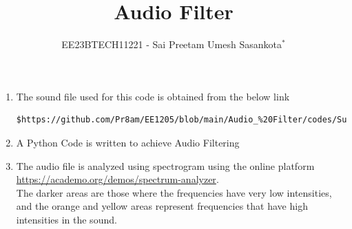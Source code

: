 \documentclass[journal,12pt,twocolumn]{IEEEtran}
\theoremstyle{remark}
\begin{document}

\vspace{3cm}
\title{Audio Filter}
\author{EE23BTECH11221 - Sai Preetam Umesh Sasankota$^{*}$%
}
\maketitle
\newpage
\bigskip
\renewcommand{\thefigure}{\arabic{figure}}
\renewcommand{\thetable}{\theenumi}


\begin{enumerate}[label=\thesection.\arabic*
,ref=\thesection.\theenumi]
\section{Digital Filter}
\label{input_sound}
\item The sound file used for this code is obtained from the below link
\begin{lstlisting}
$https://github.com/Pr8am/EE1205/blob/main/Audio_%20Filter/codes/Sunshine.wav
\end{lstlisting}
\item 
\label{Python code}
A Python Code is written to achieve Audio Filtering 
\label{prob:audio_filter_problem}

\item 
\label{Visualization}

The audio file is analyzed using spectrogram using the online platform \href{https://academo.org/demos/spectrum-analyzer}{\url{https://academo.org/demos/spectrum-analyzer}}.\\

The darker areas are those where the frequencies have very low intensities, and the orange and yellow areas represent frequencies that have high intensities in the sound.



\end{enumerate}
\end{document}
